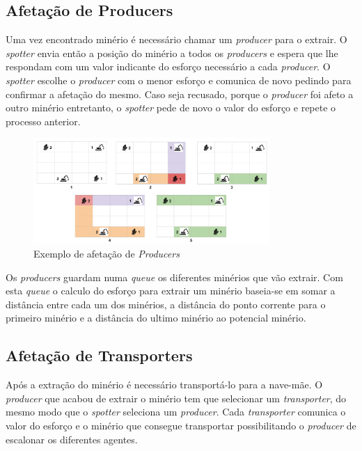 \documentclass[12pt]{report}
\begin{document}
\FloatBarrier
\newpage
\subsection{Afetação de Producers}
Uma vez encontrado minério é necessário chamar um \emph{producer} para o extrair. O \emph{spotter} envia então a posição do 
minério a todos os \emph{producers} e espera que lhe respondam com um valor indicante do esforço necessário a cada \emph{producer}.
O \emph{spotter} escolhe o \emph{producer} com o menor esforço e comunica de novo pedindo para confirmar a afetação do mesmo.
Caso seja recusado, porque o \emph{producer} foi afeto a outro minério entretanto, o \emph{spotter} pede de novo o valor do esforço
e repete o processo anterior.

\begin{figure}[h]
  \centering
    \includegraphics[width=0.8\textwidth]{producer-scheduling}
  \caption{\small{Exemplo de afetação de \textit{Producers}}}
\end{figure}

Os \emph{producers} guardam numa \emph{queue} os diferentes minérios que vão extrair. Com esta \emph{queue} o calculo do esforço
para extrair um minério baseia-se em somar a distância entre cada um dos minérios, a distância do ponto corrente para o primeiro
minério e a distância do ultimo minério ao potencial minério.

\FloatBarrier
\newpage
\subsection{Afetação de Transporters}
Após a extração do minério é necessário transportá-lo para a nave-mãe. O \emph{producer} que acabou de extrair o minério tem que selecionar 
um \emph{transporter}, do mesmo modo que o \emph{spotter} seleciona um \emph{producer}. Cada \emph{transporter} comunica o valor
do esforço e o minério que consegue transportar possibilitando o \emph{producer} de escalonar os diferentes agentes.
\end{document}
